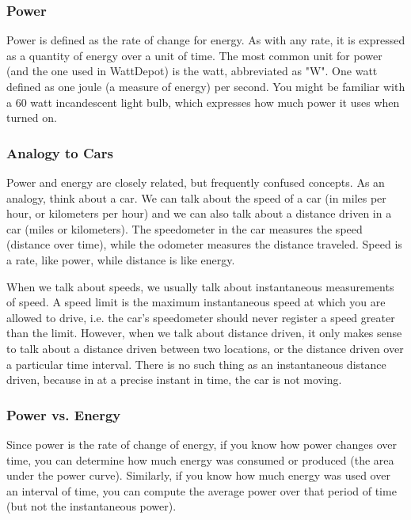 \subsubsection{Power}

Power is defined as the rate of change for energy. As with any rate, it is expressed as a quantity of energy over a unit of time. The most common unit for power (and the one used in WattDepot) is the watt, abbreviated as "W". One watt defined as one joule (a measure of energy) per second. You might be familiar with a 60 watt incandescent light bulb, which expresses how much power it uses when turned on.

\subsubsection{Analogy to Cars}

Power and energy are closely related, but frequently confused concepts. As an analogy, think about a car. We can talk about the speed of a car (in miles per hour, or kilometers per hour) and we can also talk about a distance driven in a car (miles or kilometers). The speedometer in the car measures the speed (distance over time), while the odometer measures the distance traveled. Speed is a rate, like power, while distance is like energy.

When we talk about speeds, we usually talk about instantaneous measurements of speed. A speed limit is the maximum instantaneous speed at which you are allowed to drive, i.e. the car's speedometer should never register a speed greater than the limit. However, when we talk about distance driven, it only makes sense to talk about a distance driven between two locations, or the distance driven over a particular time interval. There is no such thing as an instantaneous distance driven, because in at a precise instant in time, the car is not moving.

\subsubsection{Power vs. Energy}

Since power is the rate of change of energy, if you know how power changes over time, you can determine how much energy was consumed or produced (the area under the power curve). Similarly, if you know how much energy was used over an interval of time, you can compute the average power over that period of time (but not the instantaneous power).

